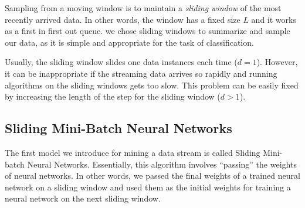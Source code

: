 \documentclass[conference]{IEEEtran}
\begin{document}
		Sampling from a moving window is to maintain a \emph{sliding window} of the most recently arrived data. In other words, the window has a fixed size $L$ and it works as a first in first out queue. we chose sliding windows to summarize and sample our data, as it is simple and appropriate for the task of classification. 
		
		Usually, the sliding window slides one data instances each time ($d=1$). However, it can be inappropriate if the streaming data arrives so rapidly and running algorithms on the sliding windows gets too slow. This problem can be easily fixed by increasing the length of the step for the sliding window ($d>1$).  
		
		\subsection{Sliding Mini-Batch Neural Networks}
		The first model we introduce for mining a data stream is called Sliding Mini-batch Neural Networks. Essentially, this algorithm involves ``passing'' the weights of neural networks. In other words, we passed the final weights of a trained neural network on a sliding window and used them as the initial weights for training a neural network on the next sliding window.
\end{document}
